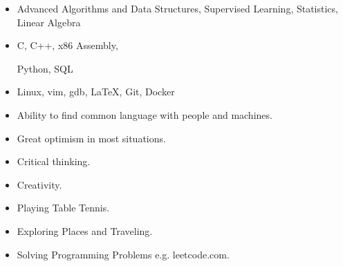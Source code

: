 \documentclass[10pt,a4paper,ragged2e]{altacv}
\begin{document}
\smallskip
\begin{itemize}
\item {} Advanced Algorithms and Data Structures, Supervised Learning, Statistics, Linear Algebra
\smallskip
\item {} C, C++, x86 Assembly,\par Python, SQL
\smallskip
\item {} Linux, vim, gdb, LaTeX, Git, Docker
\end{itemize}

\smallskip
\begin{itemize}
\item Ability to find common language with people and machines.
\smallskip
\item Great optimism in most situations.
\smallskip
\item Critical thinking.
\smallskip
\item Creativity.
\end{itemize}

\smallskip
\begin{itemize}
\item Playing Table Tennis.
\smallskip
\item Exploring Places and Traveling.
\smallskip
\item Solving Programming Problems e.g. leetcode.com.
\end{itemize}




\end{document}
